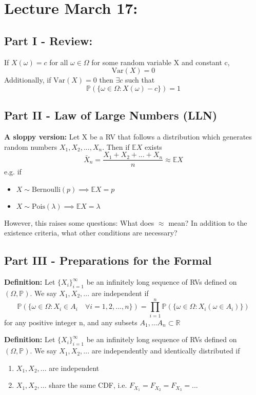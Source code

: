 \documentclass[12pt]{article}
\renewcommand{\P}{\mathbb{P}}
\newcommand{\R}{\mathbb{R}}
\newcommand{\E}{\mathbb{E}}
\begin{document}
\section*{Lecture March 17:}
\subsection*{Part I - Review:}
If $X(\omega) = c$ for all $\omega \in \Omega$ for some random variable X and constant c, 
\[\text{Var}(X) = 0\]
Additionally, if $\text{Var}(X) = 0$ then $\exists c$ such that 
\[\P(\{\omega \in \Omega : X(\omega) - c\}) = 1\]

\subsection*{Part II - Law of Large Numbers (LLN)}
\textbf{A sloppy version:}
Let X be a RV that follows a distribution which generates random numbers $X_1, X_2, ..., X_n$. Then if $\E X$ exists
\[\bar{X}_n = \frac{X_1 + X_2 + ... + X_n}{n} \approx \E X\]
e.g. if \begin{itemize}
    \item $X \sim \text{Bernoulli}(p) \implies \E X = p$
    \item $X \sim \text{Pois}(\lambda) \implies \E X = \lambda$
\end{itemize}
However, this raises some questions: What does $\approx$ mean? In addition to the existence criteria, what other conditions are necessary?

\subsection*{Part III - Preparations for the Formal}
\textbf{Definition:} Let $\{X_i\}_{i=1}^\infty$ be an infinitely long sequence of RVs defined on $(\Omega, \P)$. We say $X_1, X_2, ...$ are independent if 
\[\P(\{\omega\in \Omega: X_i \in A_i \quad \forall i = 1, 2, ..., n\}) = \prod_{i=1}^{n} \P(\{\omega \in \Omega : X_i(\omega \in A_i)\})\]
for any positive integer n, and any subsets $A_1, ... A_n \subset \R$

\textbf{Definition:} Let $\{X_i\}_{i=1}^\infty$ be an infinitely long sequence of RVs defined on $(\Omega, \P)$. We say $X_1, X_2, ...$ are independently and identically distributed if 
\begin{enumerate}
    \item $X_1, X_2, ...$ are independent
    \item $X_1, X_2, ...$ share the same CDF, i.e. $F_{X_1} = F_{X_2} = F_{X_3} = ...$
\end{enumerate}
\end{document}
